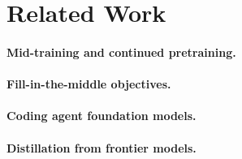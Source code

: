 \documentclass{article}
\begin{document}


%
%
%
\section{Related Work}
\label{sec:related}

\paragraph{Mid-training and continued pretraining.}

\paragraph{Fill-in-the-middle objectives.}

\paragraph{Coding agent foundation models.}

\paragraph{Distillation from frontier models.}
\end{document}
